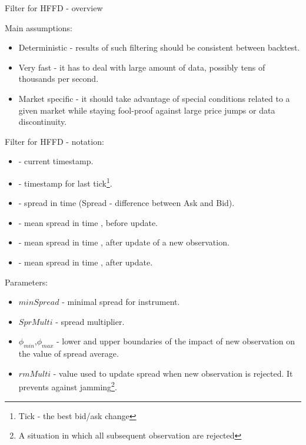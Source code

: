\documentclass{beamer}
\begin{document}
\begin{frame}{Filter for HFFD - overview}

Main assumptions:

\begin{itemize}
\item Deterministic - results of such filtering should be consistent between backtest.
\item Very fast - it has to deal with large amount of data, possibly tens of thousands per second.
\item Market specific - it should take advantage of special conditions related to a given market while staying fool-proof against large price jumps or data discontinuity. 
\end{itemize}

\end{frame}

\begin{frame}{Filter for HFFD - notation:}
\small
\begin{itemize}
\item \ts - current timestamp.
\item \tsl - timestamp for last tick\footnote{Tick - the best bid/ask change}.
\item \Spt  - spread in time \ts (Spread - difference between Ask and Bid).
\item \MSpc - mean spread in time \ts, before update.
\item \MSpn - mean spread in time \ts, after update of a new observation.
\item \MSpo - mean spread in time \tsl, after update.
\end{itemize}

Parameters:
\begin{itemize}
\item $minSpread$ - minimal spread for instrument.
\item $SprMulti$ - spread multiplier.
\item $\phi_{min}$,$\phi_{max}$ - lower and upper boundaries of the impact of new observation on the value of spread average.
\item $rmMulti$ - value used to update spread when new observation is rejected. It prevents against jamming\footnote{A situation in which all subsequent observation are rejected}.
\end{itemize}

\end{frame}
\end{document}
